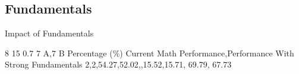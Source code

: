 \label{2.2 C7 A,7 BM Impact of Fundamentals}
\subsection{Fundamentals}
\renewcommand{\insertclass}{ - Class 7 A,7 B }
\renewcommand{\insertsubject}{- Math}

\begin{frame}{Impact of Fundamentals}


\centering
\impactOfFundamentals
    {8}
    {15}
    {0.7}
    {7 A,7 B}
    {Percentage (\%)}
    {Current Math Performance,Performance With Strong Fundamentals}
    {
        {2},{2},{54.27,52.02,},{15.52,15.71,}
    }
    {}
    {{69.79, 67.73}}


\end{frame}


%


        



